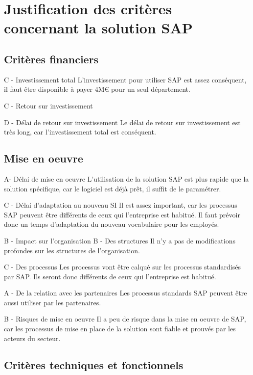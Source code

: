 \section{Justification des critères concernant la solution SAP}

\subsection{Critères financiers}

C - Investissement total
	L'investissement pour utiliser SAP est assez conséquent, il faut être disponible à payer 4M€ pour un seul département.
	
C - Retour sur investissement
		
D - Délai de retour sur investissement
	Le délai de retour sur investissement est très long, car l'investissement total est conséquent.
	
\subsection{Mise en oeuvre}

A- Délai de mise en oeuvre
	L'utilisation de la solution SAP est plus rapide que la solution spécifique, car le logiciel est déjà prêt, il suffit de le paramétrer.

C - Délai d'adaptation au nouveau SI
	Il est assez important, car les processus SAP peuvent être différents de ceux qui l'entreprise est habitué. Il faut prévoir donc un temps d'adaptation du nouveau vocabulaire pour les employés.

B - Impact sur l'organisation
	B - Des structures
		Il n'y a pas de modifications profondes sur les structures de l'organisation.
		
	C - Des processus
		Les processus vont être calqué sur les processus standardisés par SAP. Ils seront donc différents de ceux qui l'entreprise est habitué.

	A - De la relation avec les partenaires
		Les processus standards SAP peuvent être aussi utiliser par les partenaires.

B - Risques de mise en oeuvre
	Il a peu de risque dans la mise en oeuvre de SAP, car les processus de mise en place de la solution sont fiable et prouvés par les acteurs du secteur. 
	

\subsection{Critères techniques et fonctionnels}

